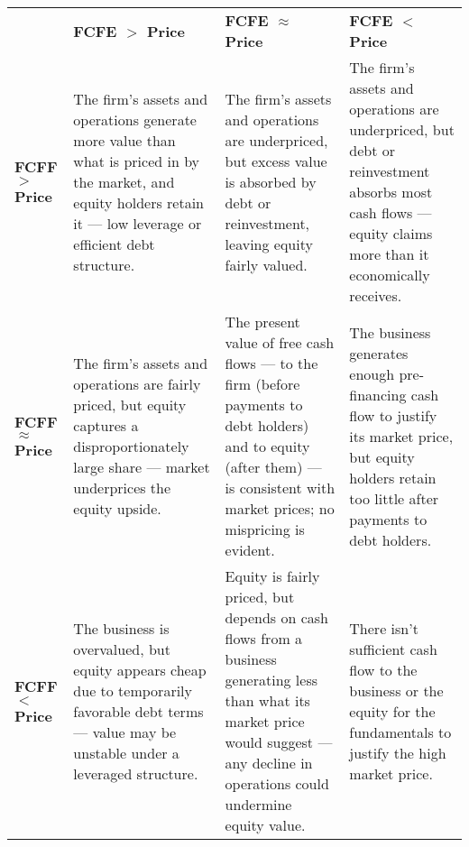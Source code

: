 \noindent
\begin{tabular}{>{\raggedright\arraybackslash}p{}
                >{\raggedright\arraybackslash}p{}
                >{\raggedright\arraybackslash}p{}
                >{\raggedright\arraybackslash}p{}}

\textbf{} 
& \textbf{FCFE $>$ Price} 
& \textbf{FCFE $\approx$ Price} 
& \textbf{FCFE $<$ Price} \\

\textbf{FCFF $>$ Price}
& \signalstrongbuy{} The firm's assets and operations generate more value than what is priced in by the market, and equity holders retain it — low leverage or efficient debt structure.
& \signalbuy{} The firm's assets and operations are underpriced, but excess value is absorbed by debt or reinvestment, leaving equity fairly valued.
& \signalcaution{} The firm's assets and operations are underpriced, but debt or reinvestment absorbs most cash flows — equity claims more than it economically receives. \\

\textbf{FCFF $\approx$ Price}
& \signalbuy{} The firm's assets and operations are fairly priced, but equity captures a disproportionately large share — market underprices the equity upside.
& \signalhold{} The present value of free cash flows — to the firm (before payments to debt holders) and to equity (after them) — is consistent with market prices; no mispricing is evident.
& \signalspeculative{} The business generates enough pre-financing cash flow to justify its market price, but equity holders retain too little after payments to debt holders. \\

\textbf{FCFF $<$ Price}
& \signalcaution{} The business is overvalued, but equity appears cheap due to temporarily favorable debt terms — value may be unstable under a leveraged structure.
& \signalspeculative{} Equity is fairly priced, but depends on cash flows from a business generating less than what its market price would suggest — any decline in operations could undermine equity value.
& \signalavoid{} There isn't sufficient cash flow to the business or the equity for the fundamentals to justify the high market price. \\
\end{tabular}
